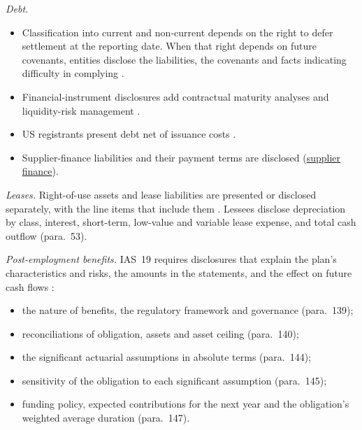 \begin{qfdefinition}\label{def:long-term-liability-compensation-disclosures}
 \emph{Debt.}
\begin{itemize}
\item Classification into current and non-current depends on the right to defer settlement at the reporting date. When that right depends on future covenants, entities disclose the liabilities, the covenants and facts indicating difficulty in complying \citep[Annex, IAS~1 paras.~69--76ZA]{eu-2023-2822-ias1}.
\item Financial-instrument disclosures add contractual maturity analyses and liquidity-risk management \citep[IFRS~7 para.~39]{eu-2023-1803-ifrs7}.
\item US registrants present debt net of issuance costs \citep[p.~1]{us-debt-issuance-costs-2015}.
\item Supplier-finance liabilities and their payment terms are disclosed (\hyperref[meth:cash-flow-interpretation]{supplier finance}).
\end{itemize}

\emph{Leases.} Right-of-use assets and lease liabilities are presented or disclosed separately, with the line items that include them \citep[IFRS~16 para.~47]{eu-2023-1803-ifrs16}. Lessees disclose depreciation by class, interest, short-term, low-value and variable lease expense, and total cash outflow (para.~53).

\emph{Post-employment benefits.} IAS~19 requires disclosures that explain the plan's characteristics and risks, the amounts in the statements, and the effect on future cash flows \citep[IAS~19 para.~135]{eu-2023-1803-ias19}:
\begin{itemize}
\item the nature of benefits, the regulatory framework and governance (para.~139);
\item reconciliations of obligation, assets and asset ceiling (para.~140);
\item the significant actuarial assumptions in absolute terms (para.~144);
\item sensitivity of the obligation to each significant assumption (para.~145);
\item funding policy, expected contributions for the next year and the obligation's weighted average duration (para.~147).
\end{itemize}


\end{qfdefinition}
